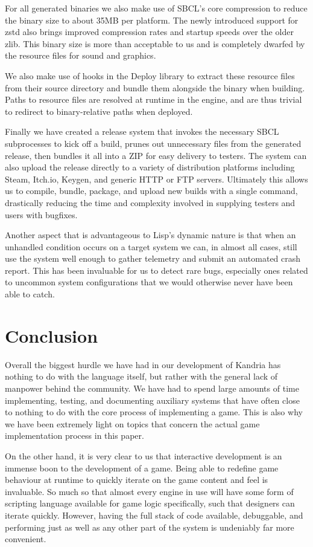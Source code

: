 \documentclass[format=sigconf]{acmart}
\begin{document}
For all generated binaries we also make use of SBCL's core compression to reduce the binary size to about 35MB per platform. The newly introduced support for zstd also brings improved compression rates and startup speeds over the older zlib. This binary size is more than acceptable to us and is completely dwarfed by the resource files for sound and graphics.

We also make use of hooks in the Deploy library to extract these resource files from their source directory and bundle them alongside the binary when building. Paths to resource files are resolved at runtime in the engine, and are thus trivial to redirect to binary-relative paths when deployed.

Finally we have created a release system that invokes the necessary SBCL subprocesses to kick off a build, prunes out unnecessary files from the generated release, then bundles it all into a ZIP for easy delivery to testers. The system can also upload the release directly to a variety of distribution platforms including Steam, Itch.io, Keygen, and generic HTTP or FTP servers. Ultimately this allows us to compile, bundle, package, and upload new builds with a single command, drastically reducing the time and complexity involved in supplying testers and users with bugfixes.

Another aspect that is advantageous to Lisp's dynamic nature is that when an unhandled condition occurs on a target system we can, in almost all cases, still use the system well enough to gather telemetry and submit an automated crash report. This has been invaluable for us to detect rare bugs, especially ones related to uncommon system configurations that we would otherwise never have been able to catch.

\section{Conclusion}\label{conclusion}
Overall the biggest hurdle we have had in our development of Kandria has nothing to do with the language itself, but rather with the general lack of manpower behind the community. We have had to spend large amounts of time implementing, testing, and documenting auxiliary systems that have often close to nothing to do with the core process of implementing a game. This is also why we have been extremely light on topics that concern the actual game implementation process in this paper.

On the other hand, it is very clear to us that interactive development is an immense boon to the development of a game. Being able to redefine game behaviour at runtime to quickly iterate on the game content and feel is invaluable. So much so that almost every engine in use will have some form of scripting language available for game logic specifically, such that designers can iterate quickly. However, having the full stack of code available, debuggable, and performing just as well as any other part of the system is undeniably far more convenient.
\end{document}
